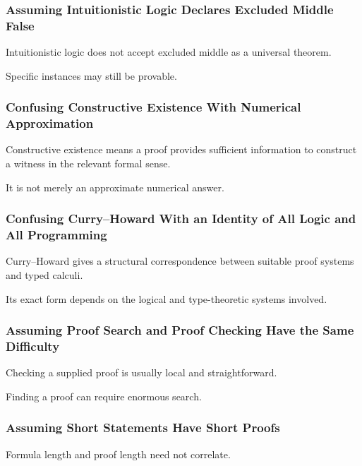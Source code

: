 \subsubsection{Assuming Intuitionistic Logic Declares Excluded Middle False}

Intuitionistic logic does not accept excluded middle as a universal theorem.

Specific instances may still be provable.

\subsubsection{Confusing Constructive Existence With Numerical Approximation}

Constructive existence means a proof provides sufficient information to
construct a witness in the relevant formal sense.

It is not merely an approximate numerical answer.

\subsubsection{Confusing Curry--Howard With an Identity of All Logic and All Programming}

Curry--Howard gives a structural correspondence between suitable proof
systems and typed calculi.

Its exact form depends on the logical and type-theoretic systems involved.

\subsubsection{Assuming Proof Search and Proof Checking Have the Same Difficulty}

Checking a supplied proof is usually local and straightforward.

Finding a proof can require enormous search.

\subsubsection{Assuming Short Statements Have Short Proofs}

Formula length and proof length need not correlate.

